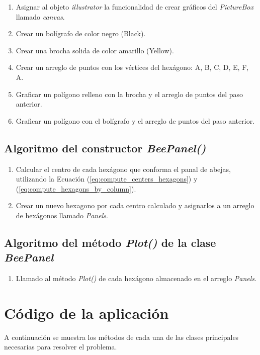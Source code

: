 \documentclass[oneside, a4paper]{article}
\begin{document}
            \begin{enumerate}
                \item Asignar al objeto \textit{illustrator} la funcionalidad de crear gráficos del \textit{PictureBox} llamado \textit{canvas}.
                \item Crear un bolígrafo de color negro (Black).
                \item Crear una brocha solida de color amarillo (Yellow).
                \item Crear un arreglo de puntos con los vértices del hexágono: A, B, C, D, E, F, A.
                \item Graficar un polígono relleno con la brocha y el arreglo de puntos del paso anterior.
                \item Graficar un polígono con el bolígrafo y el arreglo de puntos del paso anterior.
            \end{enumerate}
            
        \subsection{Algoritmo del constructor \textit{BeePanel()}}

            \begin{enumerate}
                \item Calcular el centro de cada hexágono que conforma el panal de abejas, utilizando la Ecuación (\ref{eq:compute_centers_hexagons}) y (\ref{eq:compute_hexagons_by_column}).
                \item Crear un nuevo hexagono por cada centro calculado y asignarlos a un arreglo de hexágonos llamado \textit{Panels}.
            \end{enumerate}

        \subsection{Algoritmo del método \textit{Plot()} de la clase \textit{BeePanel}}

            \begin{enumerate}
                \item Llamado al método \textit{Plot()} de cada hexágono almacenado en el arreglo \textit{Panels}.
            \end{enumerate}

    \section{Código de la aplicación}
        A continuación se muestra los métodos de cada una de las clases principales necesarias para resolver el problema.
\end{document}
